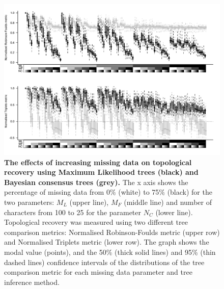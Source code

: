 \begin{figure}[!ht]
\centering
    \includegraphics[width=1\textwidth]{TEM/Figures/Fig5_revised.pdf}
\caption[Effects of increasing missing data on topological recovery in Maximum Likelihood and Bayesian inference]{\textbf{The effects of increasing missing data on topological recovery using Maximum Likelihood trees (black) and Bayesian consensus trees (grey).} The x axis shows the percentage of missing data from 0\% (white) to 75\% (black) for the two parameters: $M_{L}$ (upper line), $M_{F}$ (middle line) and number of characters from 100 to 25 for the parameter $N_{C}$ (lower line). Topological recovery was measured using two different tree comparison metrics: Normalised Robinson-Foulds metric (upper row) and Normalised Triplets metric (lower row). The graph shows the modal value (points), and the 50\% (thick solid lines) and 95\% (thin dashed lines) confidence intervals of the distributions of the tree comparison metric for each missing data parameter and tree inference method.} 
\label{Fig_Results-global_perparam}
\end{figure}

